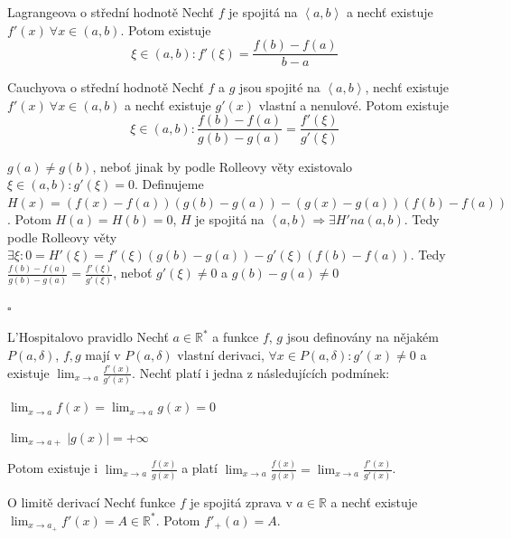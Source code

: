 \begin{vetaN}{Lagrangeova o střední hodnotě}
Nechť $f$ je spojitá na $\left<a, b\right>$ a nechť existuje $f'(x)\ \forall x \in (a,b)$. Potom existuje $$\xi \in (a,b): f'(\xi)=\frac{f(b)-f(a)}{b-a}$$
\end{vetaN}

\begin{vetaN}{Cauchyova o střední hodnotě}
Nechť $f$ a $g$ jsou spojité na $\left<a, b\right>$, nechť existuje $f'(x)\ \forall x \in (a,b)$ a nechť existuje $g'(x)$ vlastní a nenulové. Potom existuje $$\xi \in (a,b): \frac{f(b)-f(a)}{g(b)-g(a)}=\frac{f'(\xi)}{g'(\xi)}$$

\begin{dukaz}
$g(a) \neq g(b)$, neboť jinak by podle Rolleovy věty existovalo $\xi \in (a,b): g'(\xi)=0$. Definujeme $H(x)=(f(x)-f(a))(g(b)-g(a))-(g(x)-g(a))(f(b)-f(a))$. Potom $H(a)=H(b)=0$, $H$ je spojitá na $\left<a, b\right> \Rightarrow \exists H' na (a,b)$. Tedy podle Rolleovy věty $\exists \xi: 0 = H'(\xi)=f'(\xi)(g(b)-g(a))-g'(\xi)(f(b)-f(a))$. Tedy $\frac{f(b)-f(a)}{g(b)-g(a)}=\frac{f'(\xi)}{g'(\xi)}$, neboť $g'(\xi) \neq 0$ a $g(b)-g(a)\neq 0$ 
\begin{flushright}$\square$\end{flushright}
\end{dukaz}
\end{vetaN}

\begin{vetaN}{L'Hospitalovo pravidlo}
\csprimeson
Nechť $a \in \mathbb{R}^{*}$ a funkce $f$, $g$ jsou definovány na nějakém $P(a, \delta)$, $f, g$ mají v $P(a,\delta)$ vlastní derivaci, $\forall x \in P(a,\delta): g'(x)\not=0$ a existuje $\lim_{x \rightarrow a} \frac{f'(x)}{g'(x)}$. Nechť platí i jedna z následujících podmínek:
\begin{penumerate}
	\item $\lim_{x \rightarrow a} f(x)=\lim_{x \rightarrow a} g(x)=0$
	\item $\lim_{x \rightarrow a+} |g(x)|=+\infty$
\end{penumerate}
Potom existuje i $\lim_{x \rightarrow a} \frac{f(x)}{g(x)}$ a platí $\lim_{x \rightarrow a} \frac{f(x)}{g(x)}=\lim_{x \rightarrow a} \frac{f'(x)}{g'(x)}$.
\end{vetaN}

\begin{vetaN}{O limitě derivací}
Nechť funkce $f$ je spojitá zprava v $a \in \mathbb{R}$ a nechť existuje $\lim_{x \rightarrow a_+} f'(x)=A \in \mathbb{R}^*$. Potom $f'_+(a)=A$.
\end{vetaN}


